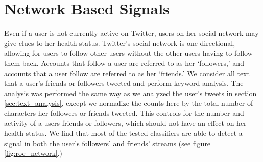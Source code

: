 \section{Network Based Signals}

Even if a user is not currently active on Twitter, users on her social network may give clues to her health status. Twitter's social network is one directional, allowing for users to follow other users without the other users having to follow them back. Accounts that follow a user are referred to as her `followers,' and accounts that a user follow are referred to as her `friends.' We consider all text that a user's friends or followers tweeted and perform keyword analysis. The analysis was performed the same way as we analyzed the user's tweets in section \ref{sec:text_analysis}, except we normalize the counts here by the total number of characters her followers or friends tweeted. This controls for the number and activity of a users friends or followers, which should not have an effect on her health status. We find that most of the tested classifiers are able to detect a signal in both the user's followers' and friends' streams (see figure \ref{fig:roc_network}.)


